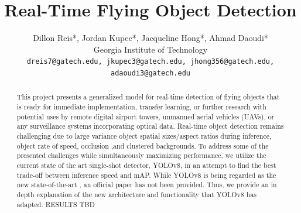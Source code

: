 \documentclass[10pt,twocolumn,letterpaper]{article}
\begin{document}
\title{Real-Time Flying Object Detection}

\author{Dillon Reis*, Jordan Kupec*, Jacqueline Hong*, Ahmad Daoudi*\\
Georgia Institute of Technology\\
{\tt\small dreis7@gatech.edu, jkupec3@gatech.edu, jhong356@gatech.edu, adaoudi3@gatech.edu}
}

\maketitle

\begin{abstract}
   This project presents a generalized model for real-time detection of flying objects that is ready for immediate implementation, transfer learning, or further research with potential uses by remote digital airport towers, unmanned aerial vehicles (UAVs), or any surveillance systems incorporating optical data. Real-time object detection remains challenging due to large variance object spatial sizes/aspect ratios during inference, object rate of speed, occlusion ,and clustered backgrounds. To address some of the presented challenges while simultaneously maximizing performance, we utilize the current state of the art single-shot detector, YOLOv8, in an attempt to find the best trade-off between inference speed and mAP. While YOLOv8 is being regarded as the new state-of-the-art \cite{state-of-the-art}, an official paper has not been provided. Thus, we provide an in depth explanation of the new architecture and functionality that YOLOv8 has adapted. RESULTS TBD
\end{abstract}

\end{document}

